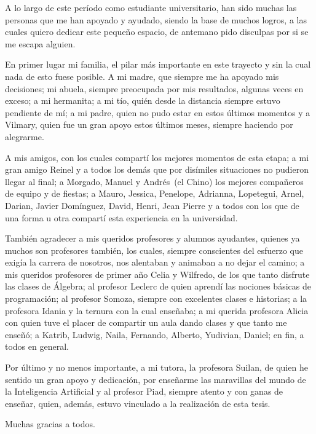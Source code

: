 \begin{acknowledgements}
    A lo largo de este período como estudiante universitario, han sido muchas
    las personas que me han apoyado y ayudado, siendo la base de muchos logros,
    a las cuales quiero dedicar este pequeño espacio, de antemano pido disculpas
    por si se me escapa alguien.
    
    En primer lugar mi familia, el pilar más importante en este trayecto y sin
    la cual nada de esto fuese posible. A mi madre, que siempre me ha apoyado
    mis decisiones; mi abuela, siempre preocupada por mis resultados, algunas
    veces en exceso; a mi hermanita; a mi tío, quién desde la distancia siempre
    estuvo pendiente de mí; a mi padre, quien no pudo estar en estos últimos
    momentos y a Vilmary, quien fue un gran apoyo estos últimos meses, siempre
    haciendo por alegrarme.

    A mis amigos, con los cuales compartí los mejores momentos de esta etapa;
    a mi gran amigo Reinel y a todos los demás que por disímiles situaciones
    no pudieron llegar al final; a Morgado, Manuel y Andrés~(el Chino) los
    mejores compañeros de equipo y de fiestas; a Mauro, Jessica, Penelope,
    Adrianna, Lopetegui, Arnel, Darian, Javier Domínguez, David, Henri, Jean
    Pierre y a todos con los que de una forma u otra compartí esta experiencia
    en la universidad.

    También agradecer a mis queridos profesores y alumnos ayudantes, quienes ya
    muchos son profesores también, los cuales, siempre conscientes del esfuerzo
    que exigía la carrera de nosotros, nos alentaban y animaban a no dejar el
    camino; a mis queridos profesores de primer año Celia y Wilfredo, de los
    que tanto disfrute las clases de Álgebra; al profesor Leclerc de quien
    aprendí las nociones básicas de programación; al profesor Somoza, siempre
    con excelentes clases e historias; a la profesora Idania y la ternura con la
    cual enseñaba; a mi querida profesora Alicia con quien tuve el placer de
    compartir un aula dando clases y que tanto me enseñó; a Katrib, Ludwig,
    Naila, Fernando, Alberto, Yudivian, Daniel; en fin, a todos en general.

    Por último y no menos importante, a mi tutora, la profesora Suilan, de
    quien he sentido un gran apoyo y dedicación, por enseñarme las
    maravillas del mundo de la Inteligencia Artificial y al profesor Piad,
    siempre atento y con ganas de enseñar, quien, además, estuvo vinculado a la
    realización de esta tesis.

    Muchas gracias a todos.
\end{acknowledgements}
